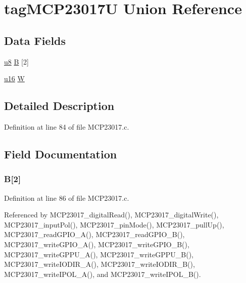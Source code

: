 \hypertarget{uniontag_m_c_p23017_u}{\section{tag\-M\-C\-P23017\-U Union Reference}
\label{uniontag_m_c_p23017_u}
}
\subsection*{Data Fields}
\begin{DoxyCompactItemize}
\item 
\hyperlink{p8_2pinguino_2core_2typedef_8h_aed742c436da53c1080638ce6ef7d13de}{u8} \hyperlink{uniontag_m_c_p23017_u_afbf45cd436efe78db33ea8692e838fef}{B} \mbox{[}2\mbox{]}
\item 
\hyperlink{p8_2pinguino_2core_2typedef_8h_a50b0d1c7a54fa09a64a3ac111c778520}{u16} \hyperlink{uniontag_m_c_p23017_u_a46abd0e479371c5e886b9236e98ce322}{W}
\end{DoxyCompactItemize}


\subsection{Detailed Description}


Definition at line 84 of file M\-C\-P23017.\-c.



\subsection{Field Documentation}
\hypertarget{uniontag_m_c_p23017_u_afbf45cd436efe78db33ea8692e838fef}{
\subsubsection[{B}]{ B\mbox{[}2\mbox{]}}}\label{uniontag_m_c_p23017_u_afbf45cd436efe78db33ea8692e838fef}


Definition at line 86 of file M\-C\-P23017.\-c.



Referenced by M\-C\-P23017\-\_\-digital\-Read(), M\-C\-P23017\-\_\-digital\-Write(), M\-C\-P23017\-\_\-input\-Pol(), M\-C\-P23017\-\_\-pin\-Mode(), M\-C\-P23017\-\_\-pull\-Up(), M\-C\-P23017\-\_\-read\-G\-P\-I\-O\-\_\-\-A(), M\-C\-P23017\-\_\-read\-G\-P\-I\-O\-\_\-\-B(), M\-C\-P23017\-\_\-write\-G\-P\-I\-O\-\_\-\-A(), M\-C\-P23017\-\_\-write\-G\-P\-I\-O\-\_\-\-B(), M\-C\-P23017\-\_\-write\-G\-P\-P\-U\-\_\-\-A(), M\-C\-P23017\-\_\-write\-G\-P\-P\-U\-\_\-\-B(), M\-C\-P23017\-\_\-write\-I\-O\-D\-I\-R\-\_\-\-A(), M\-C\-P23017\-\_\-write\-I\-O\-D\-I\-R\-\_\-\-B(), M\-C\-P23017\-\_\-write\-I\-P\-O\-L\-\_\-\-A(), and M\-C\-P23017\-\_\-write\-I\-P\-O\-L\-\_\-\-B().

